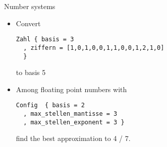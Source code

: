 \begin{slide}{Number systems}

\begin{itemize}
\item
  Convert
\begin{verbatim}
Zahl { basis = 3
  , ziffern = [1,0,1,0,0,1,1,0,0,1,2,1,0]
  }
\end{verbatim}
  to basis 5
\item
Among floating point numbers with
\begin{verbatim}
Config  { basis = 2 
  , max_stellen_mantisse = 3 
  , max_stellen_exponent = 3 }
\end{verbatim}
find the best approximation to 4 / 7.



\end{itemize}

\end{slide}
